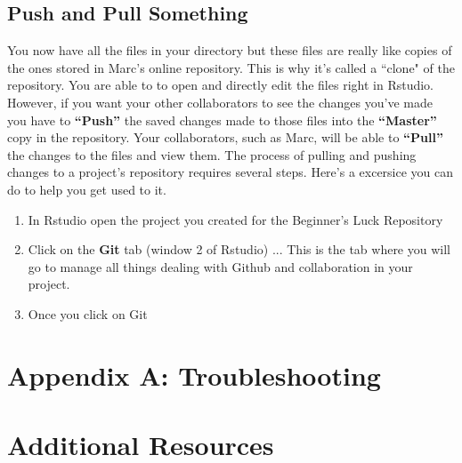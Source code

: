 \documentclass{article}\usepackage[]{graphicx}\usepackage[]{color}
\begin{document}
  \subsection*{Push and Pull Something}
  You now have all the files in your directory but these files are really like copies of the ones stored in Marc's online repository. This is why it's called a ``clone" of the repository. You are able to to open and directly edit the files right in Rstudio. However, if you want your other collaborators to see the changes you've made you have to \textbf{``Push''} the saved changes made to those files into the \textbf{``Master''} copy in the repository. Your collaborators, such as Marc, will be able to \textbf{``Pull''} the changes to the files and view them. The process of pulling and pushing changes to a project's repository requires several steps. Here's a excersice you can do to help you get used to it. 
  \begin{enumerate}
  \item In Rstudio open the project you created for the Beginner's Luck Repository 
  \item Click on the \textbf{Git} tab (window 2 of Rstudio) ... This is the tab where you will go to manage all things dealing with Github and collaboration in your project.
  \item Once you click on Git
  \end{enumerate}
\section{Appendix A: Troubleshooting}
\section{Additional Resources}
\end{document}

